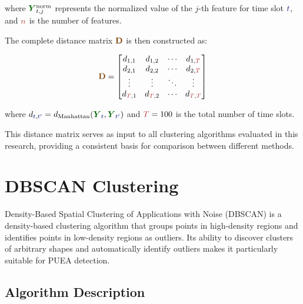 \noindent where $\vector{Y}_{t,j}^{\text{norm}}$ represents the normalized value of the $j$-th feature for time slot $\variable{t}$, and $\parameter{n}$ is the number of features.

The complete distance matrix $\matrix{D}$ is then constructed as:

\begin{tcolorbox}[enhanced, colback=blue!5, colframe=blue!75!black, 
arc=0pt, outer arc=0pt, boxrule=1pt, left=5pt, right=5pt, top=6pt, bottom=6pt]
\begin{equation}
    \matrix{D} = \begin{bmatrix}
        d_{1,1} & d_{1,2} & \cdots & d_{1,\parameter{T}} \\
        d_{2,1} & d_{2,2} & \cdots & d_{2,\parameter{T}} \\
        \vdots & \vdots & \ddots & \vdots \\
        d_{\parameter{T},1} & d_{\parameter{T},2} & \cdots & d_{\parameter{T},\parameter{T}}
    \end{bmatrix}
\end{equation}
\end{tcolorbox}

where $d_{\variable{t},\variable{t'}} = d_{\text{Manhattan}}(\vector{Y}_{\variable{t}}, \vector{Y}_{\variable{t'}})$ and $\parameter{T} = 100$ is the total number of time slots.

This distance matrix serves as input to all clustering algorithms evaluated in this research, providing a consistent basis for comparison between different methods.

\section{\texorpdfstring{\large\textbf{DBSCAN Clustering}}{DBSCAN Clustering}}
\begin{tcolorbox}[enhanced, colback=blue!5, colframe=blue!75!black, title=About DBSCAN, sharp corners]
Density-Based Spatial Clustering of Applications with Noise (DBSCAN) is a density-based clustering algorithm that groups points in high-density regions and identifies points in low-density regions as outliers. Its ability to discover clusters of arbitrary shapes and automatically identify outliers makes it particularly suitable for PUEA detection.
\end{tcolorbox}

\subsection{Algorithm Description}

